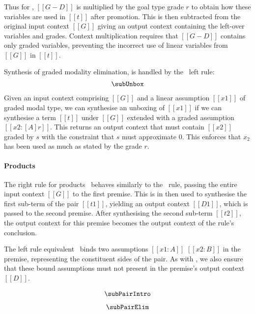 
Thus for \subBoxName, $[[ G - D ]]$ is multiplied by the goal type grade $r$ to obtain how these
  variables are used in $[[t]]$ after promotion. This is then subtracted from
  the original input context $[[G]]$ giving an output context
  containing the left-over variables and grades. Context
  multiplication
  requires that $[[G - D]]$ contains only graded variables,
  preventing the incorrect use of linear variables from $[[G]]$ in
  $[[t]]$.

Synthesis of graded modality elimination, is handled by the
  \subUnboxName\ left rule:
  \begin{align*}
    \subUnbox
    \end{align*}
%
  Given an input context comprising $[[ G ]]$ and a linear
  assumption $[[ x1 ]]$ of graded modal type, we can synthesise an unboxing of
  $[[x1]]$ if we can synthesise a term $[[t]]$ under $[[G]]$
  extended with a graded assumption $[[x2 : [A] r]]$. This returns an output
  context that must contain $[[x2]]$ graded by $s$
  with the constraint that $s$ must approximate $0$. This enforces
  that $x_2$ has been used as much as stated by the grade $r$.

\paragraph{Products}
The right rule for products \subPairIntroName\ behaves similarly to the
\subAppName\ rule, passing the entire input context $[[ G ]]$ to the first
premise. This is in then used to synthesise the first sub-term of the pair
$[[ t1 ]]$, yielding an output context $ [[ D1 ]]$, which is passed to the
second premise. After synthesising the second sub-term $[[ t2 ]]$, the output
context for this premise becomes the output context of the rule's conclusion.

The left rule equivalent \subPairElimName\  binds two assumptions
$[[ x1 : A ]]$ $[[ x2 : B ]]$ in the premise, representing the constituent sides
of the pair. As with \subAppName, we also ensure that these bound assumptions must not
present in the premise's output context $[[ D ]]$.

\begin{align*}
\begin{array}{c}
  \subPairIntro
\\[0.75em]
  \subPairElim
\end{array}
\end{align*}
